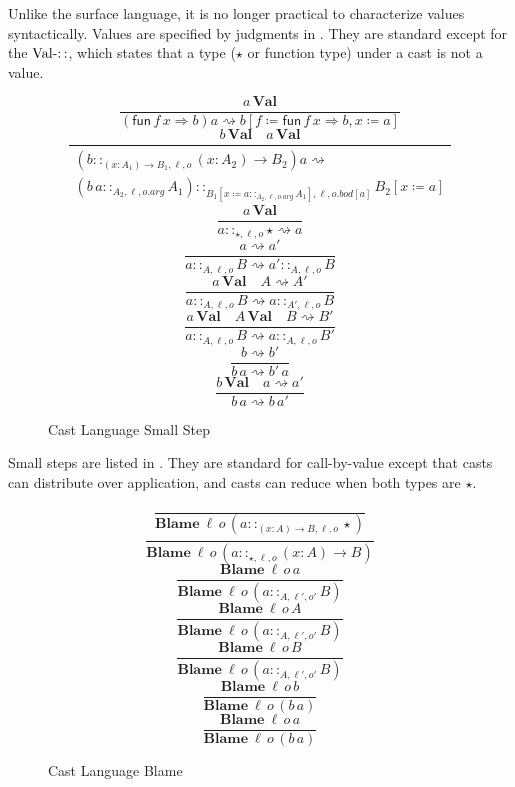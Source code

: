 Unlike the surface language, it is no longer practical to characterize values syntactically.
Values are specified by judgments in . 
They are standard except for the $\operatorname{Val-::}$, which states that a type ($\star$ or function type) under a cast is not a value.

\begin{figure}
\[
\frac{a\,\textbf{Val}}{\left(\mathsf{fun}\,f\,x\Rightarrow b\right)a\rightsquigarrow b\left[f\coloneqq\mathsf{fun}\,f\,x\Rightarrow b,x\coloneqq a\right]}
\]
\[
\frac{b\,\textbf{Val}\quad a\,\textbf{Val}}{\begin{array}{c}
\left(b::_{\left(x:A_{1}\right)\rightarrow B_{1},\ensuremath{\ell},o}\left(x:A_{2}\right)\rightarrow B_{2}\right)a\rightsquigarrow\\
\left(b\,a::_{A_{2},\ell,o.arg}A_{1}\right)::_{B_{1}\left[x\coloneqq a::_{A_{2},\ell,o.arg}A_{1}\right],\ensuremath{\ell},o.bod[a]}B_{2}\left[x\coloneqq a\right]
\end{array}}
\]
\[
\frac{a\,\textbf{Val}}{a::_{\star,\ensuremath{\ell},o}\star\rightsquigarrow a}
\]
\[
\frac{a\rightsquigarrow a'}{a::_{A,\ensuremath{\ell},o}B\rightsquigarrow a'::_{A,\ensuremath{\ell},o}B}
\]
\[
\frac{a\,\textbf{Val}\quad A\rightsquigarrow A'}{a::_{A,\ensuremath{\ell},o}B\rightsquigarrow a::_{A',\ensuremath{\ell},o}B}
\]
\[
\frac{a\,\textbf{Val}\quad A\,\textbf{Val}\quad B\rightsquigarrow B'}{a::_{A,\ensuremath{\ell},o}B\rightsquigarrow a::_{A,\ensuremath{\ell},o}B'}
\]
\[
\frac{b\rightsquigarrow b'}{b\,a\rightsquigarrow b'\,a}
\]
\[
\frac{b\,\textbf{Val}\quad a\rightsquigarrow a'}{b\,a\rightsquigarrow b\,a'}
\]

\caption{Cast Language Small Step}
\label{fig:cast-step}
\end{figure}

Small steps are listed in .
They are standard for call-by-value except that casts can distribute over application, and casts can reduce when both types are $\star$.

\begin{figure}
\[
\frac{\,}{\textbf{Blame}\:\ensuremath{\ell}\,o\,\left(a::_{\left(x:A\right)\rightarrow B,\ensuremath{\ell},o}\star\right)}
\]
\[
\frac{\,}{\textbf{Blame}\:\ensuremath{\ell}\,o\,\left(a::_{\star,\ensuremath{\ell},o}\left(x:A\right)\rightarrow B\right)}
\]
\[
\frac{\textbf{Blame}\:\ensuremath{\ell}\,o\,a}{\textbf{Blame}\:\ensuremath{\ell}\,o\,\left(a::_{A,\ensuremath{\ell'},o'}B\right)}
\]
\[
\frac{\textbf{Blame}\:\ensuremath{\ell}\,o\,A}{\textbf{Blame}\:\ensuremath{\ell}\,o\,\left(a::_{A,\ensuremath{\ell'},o'}B\right)}
\]
\[
\frac{\textbf{Blame}\:\ensuremath{\ell}\,o\,B}{\textbf{Blame}\:\ensuremath{\ell}\,o\,\left(a::_{A,\ensuremath{\ell'},o'}B\right)}
\]
\[
\frac{\textbf{Blame}\:\ensuremath{\ell}\,o\,b}{\textbf{Blame}\:\ensuremath{\ell}\,o\,\left(b\,a\right)}
\]
\[
\frac{\textbf{Blame}\:\ensuremath{\ell}\,o\,a}{\textbf{Blame}\:\ensuremath{\ell}\,o\,\left(b\,a\right)}
\]
\caption{Cast Language Blame}
\label{fig:cast-blame}
\end{figure}

